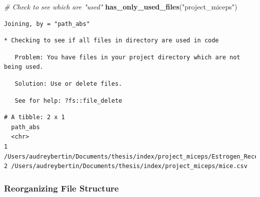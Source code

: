 \documentclass[12pt,twoside]{reedthesis}
\newenvironment{Shaded}{\begin{snugshade}}{\end{snugshade}}
\newcommand{\CommentTok}[1]{\textcolor[rgb]{0.56,0.35,0.01}{\textit{#1}}}
\newcommand{\KeywordTok}[1]{\textcolor[rgb]{0.13,0.29,0.53}{\textbf{#1}}}
\newcommand{\NormalTok}[1]{#1}
\newcommand{\StringTok}[1]{\textcolor[rgb]{0.31,0.60,0.02}{#1}}
\begin{document}
\begin{Shaded}
\begin{Highlighting}[]
\CommentTok{# Check to see which are "used"}
\KeywordTok{has_only_used_files}\NormalTok{(}\StringTok{"project_miceps"}\NormalTok{)}
\end{Highlighting}
\end{Shaded}
\begin{verbatim}
Joining, by = "path_abs"
\end{verbatim}
\begin{verbatim}
* Checking to see if all files in directory are used in code
\end{verbatim}
\begin{verbatim}
   Problem: You have files in your project directory which are not being used.
\end{verbatim}
\begin{verbatim}
   Solution: Use or delete files.
\end{verbatim}
\begin{verbatim}
   See for help: ?fs::file_delete
\end{verbatim}
\begin{verbatim}
# A tibble: 2 x 1
  path_abs                                                                      
  <chr>                                                                         
1 /Users/audreybertin/Documents/thesis/index/project_miceps/Estrogen_Receptors.~
2 /Users/audreybertin/Documents/thesis/index/project_miceps/mice.csv            
\end{verbatim}
\hypertarget{reorganizing-file-structure}{%
\subsubsection{Reorganizing File Structure}\label{reorganizing-file-structure}}
\end{document}
